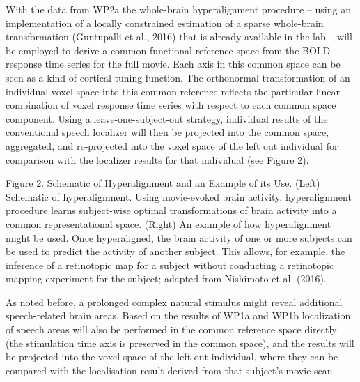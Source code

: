 With the data from WP2a
the whole-brain hyperalignment procedure -- using an implementation of a
locally constrained estimation of a sparse whole-brain transformation
(Guntupalli et al., 2016) that is already available in the lab -- will be
employed to derive a common functional reference space from the BOLD response
time series for the full movie.
%
Each axis in this common space can be seen as a
kind of cortical tuning function.
%
The orthonormal transformation of an
individual voxel space into this common reference reflects the particular linear
combination of voxel response time series with respect to each common space
component.
%
Using a leave-one-subject-out strategy, individual results of the
conventional speech localizer will then be projected into the common space,
aggregated, and re-projected into the voxel space of the left out individual for
comparison with the localizer results for that individual (see Figure 2).

%
Figure 2. Schematic of Hyperalignment and an Example of its Use. (Left)
Schematic of hyperalignment.
%
Using movie-evoked brain activity, hyperalignment procedure learns subject-wise
optimal transformations of brain activity into a common representational space.
%
(Right) An example of how hyperalignment might be used.
%
Once hyperaligned, the brain activity of one or more subjects can be used to
predict the activity of another subject.
%
This allows, for example, the inference of a retinotopic map for a subject
without conducting a retinotopic mapping experiment for the subject;
%
adapted from Nishimoto et al. (2016).

%
As noted before, a prolonged complex natural stimulus might reveal additional
speech-related brain areas.
%
Based on the results of WP1a and WP1b localization of speech areas will also be
performed in the common reference space directly (the stimulation time axis is
preserved in the common space), and the results will be projected into the voxel
space of the left-out individual, where they can be compared with the
localisation result derived from that subject’s movie scan.


